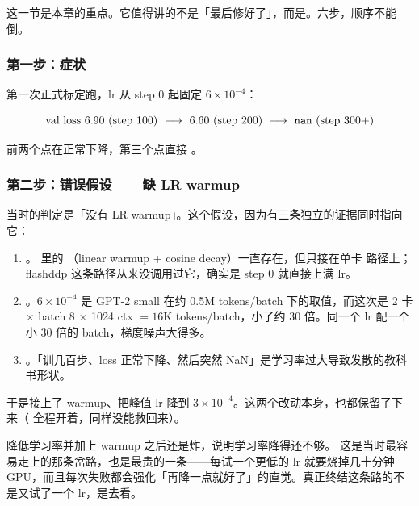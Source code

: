 这一节是本章的重点。它值得讲的不是「最后修好了」，而是。六步，顺序不能倒。

\subsubsection*{第一步：症状}

第一次正式标定跑，lr 从 step 0 起固定 $6\times10^{-4}$：

\[
\mbox{val loss } 6.90\ (\mbox{step }100)\ \longrightarrow\ 6.60\ (\mbox{step }200)\ \longrightarrow\ \mbox{\ttfamily nan}\ (\mbox{step }300+)
\]

前两个点在正常下降，第三个点直接 。

\subsubsection*{第二步：错误假设——缺 LR warmup}

当时的判定是「没有 LR warmup」。这个假设，因为有三条独立的证据同时指向它：

\begin{enumerate}[label=(\arabic*)]\itemsep3pt
  \item {}。 里的 （linear warmup + cosine decay）一直存在，但只接在单卡  路径上；flashddp 这条路径从来没调用过它，确实是 step 0 就直接上满 lr。
  \item {}。$6\times10^{-4}$ 是 GPT-2 small 在约 0.5M tokens/batch 下的取值，而这次是 2 卡 $\times$ batch 8 $\times$ 1024 ctx $= 16$K tokens/batch，小了约 30 倍。同一个 lr 配一个小 30 倍的 batch，梯度噪声大得多。
  \item {}。「训几百步、loss 正常下降、然后突然 NaN」是学习率过大导致发散的教科书形状。
\end{enumerate}

于是接上了 warmup、把峰值 lr 降到 $3\times10^{-4}$。这两个改动本身，也都保留了下来（ 全程开着，同样没能救回来）。

\begin{misconception}{降低学习率并加上 warmup 之后还是炸，说明学习率降得还不够。}
这是当时最容易走上的那条岔路，也是最贵的一条——每试一个更低的 lr 就要烧掉几十分钟 GPU，而且每次失败都会强化「再降一点就好了」的直觉。真正终结这条路的不是又试了一个 lr，是去看。
\end{misconception}


